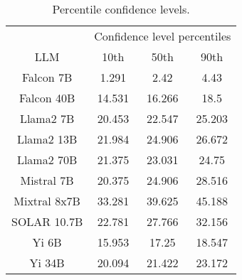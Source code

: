 \begin{table*}
\centering
\begin{tabular}{c|c|c|c}
& \multicolumn{3}{c}{Confidence level percentiles} \\ 
LLM & 10th & 50th & 90th\\ \hline
Falcon 7B & 1.291 & 2.42 & 4.43\\
Falcon 40B & 14.531 & 16.266 & 18.5\\
Llama2 7B & 20.453 & 22.547 & 25.203\\
Llama2 13B & 21.984 & 24.906 & 26.672\\
Llama2 70B & 21.375 & 23.031 & 24.75\\
Mistral 7B & 20.375 & 24.906 & 28.516\\
Mixtral 8x7B & 33.281 & 39.625 & 45.188\\
SOLAR 10.7B & 22.781 & 27.766 & 32.156\\
Yi 6B & 15.953 & 17.25 & 18.547\\
Yi 34B & 20.094 & 21.422 & 23.172\\
\hline
\end{tabular}
\caption{Percentile confidence levels.}
\label{tab:percentile_conf}
\end{table*}
